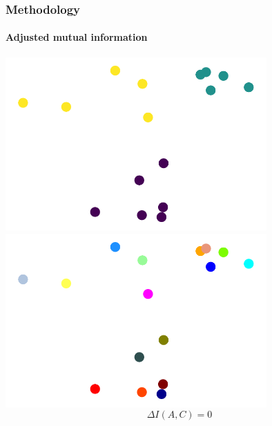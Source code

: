 \documentclass{tum-presentation}
\def\ia{\Delta I}
\begin{document}
\begin{frame} 
	\frametitle{Methodology}
	\framesubtitle{Adjusted mutual information}
	\begin{center}
		\includegraphics[width = 10cm]{../figures/cloud_cluster_1.pdf}\hspace{.5cm}\vline\hspace{.5cm}
		\includegraphics[width = 10cm]{../figures/cloud_trivial.pdf}
		$$
		\ia(A, C) = 0
		$$
	\end{center}
\end{frame}
\end{document}
